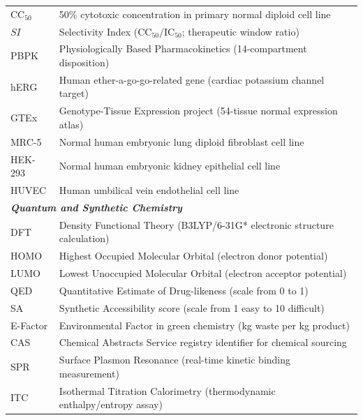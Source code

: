 \documentclass[10pt,journal,compsoc]{IEEEtran}
\begin{document}
\begin{table}[h]
{\begin{tabular}{lp{6.2cm}}
$\text{CC}_{50}$ & 50\% cytotoxic concentration in primary normal diploid cell line \\
$SI$ & Selectivity Index ($\text{CC}_{50} / \text{IC}_{50}$; therapeutic window ratio) \\
PBPK & Physiologically Based Pharmacokinetics (14-compartment disposition) \\
hERG & Human ether-a-go-go-related gene (cardiac potassium channel target) \\
GTEx & Genotype-Tissue Expression project (54-tissue normal expression atlas) \\
MRC-5 & Normal human embryonic lung diploid fibroblast cell line \\
HEK-293 & Normal human embryonic kidney epithelial cell line \\
HUVEC & Human umbilical vein endothelial cell line \\
\midrule
\multicolumn{2}{l}{\textit{\textbf{Quantum and Synthetic Chemistry}}} \\
DFT & Density Functional Theory (B3LYP/6-31G* electronic structure calculation) \\
HOMO & Highest Occupied Molecular Orbital (electron donor potential) \\
LUMO & Lowest Unoccupied Molecular Orbital (electron acceptor potential) \\
QED & Quantitative Estimate of Drug-likeness (scale from 0 to 1) \\
SA & Synthetic Accessibility score (scale from 1 easy to 10 difficult) \\
E-Factor & Environmental Factor in green chemistry (kg waste per kg product) \\
CAS & Chemical Abstracts Service registry identifier for chemical sourcing \\
SPR & Surface Plasmon Resonance (real-time kinetic binding measurement) \\
ITC & Isothermal Titration Calorimetry (thermodynamic enthalpy/entropy assay) \\
\bottomrule
\end{tabular}%
}
\end{table}
\end{document}

